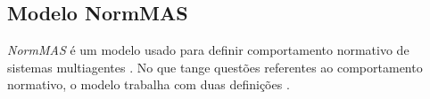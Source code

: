 \subsection{Modelo NormMAS}
\textit{NormMAS} é um modelo usado para definir comportamento normativo de sistemas multiagentes \cite{normas}. No que tange questões referentes ao comportamento normativo, o modelo trabalha com duas definições \cite{normas}.
